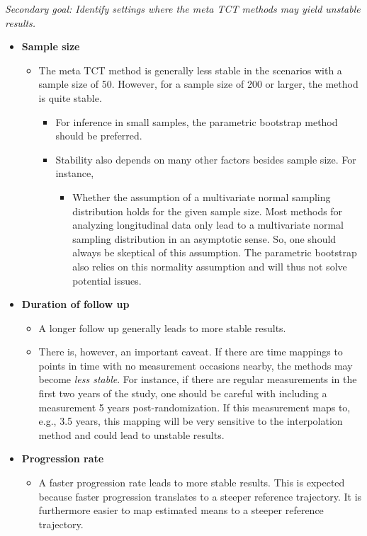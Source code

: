 \documentclass[
]{article}
\providecommand{\tightlist}{%
  \setlength{\itemsep}{0pt}\setlength{\parskip}{0pt}}
\begin{document}
\emph{Secondary goal: Identify settings where the meta TCT methods may yield
unstable results.}

\begin{itemize}
\tightlist
\item
  \textbf{Sample size}

  \begin{itemize}
  \tightlist
  \item
    The meta TCT method is generally less stable in the scenarios with a sample size of 50.
    However, for a sample size of 200 or larger, the method is quite stable.

    \begin{itemize}
    \tightlist
    \item
      For inference in small samples, the parametric bootstrap method should be preferred.
    \item
      Stability also depends on many other factors besides sample size. For instance,

      \begin{itemize}
      \tightlist
      \item
        Whether the assumption of a multivariate normal sampling distribution holds for
        the given sample size. Most methods for analyzing longitudinal data only
        lead to a multivariate normal sampling distribution in an asymptotic sense.
        So, one should always be skeptical of this assumption. The parametric
        bootstrap also relies on this normality assumption and will thus not solve
        potential issues.
      \end{itemize}
    \end{itemize}
  \end{itemize}
\item
  \textbf{Duration of follow up}

  \begin{itemize}
  \tightlist
  \item
    A longer follow up generally leads to more stable results.
  \item
    There is, however, an important caveat. If there are time mappings to points
    in time with no measurement occasions nearby, the methods may become \emph{less stable}.
    For instance, if there are regular measurements in the first two years of the study,
    one should be careful with including a measurement 5 years post-randomization.
    If this measurement maps to, e.g., 3.5 years, this mapping will be very sensitive
    to the interpolation method and could lead to unstable results.
  \end{itemize}
\item
  \textbf{Progression rate}

  \begin{itemize}
  \tightlist
  \item
    A faster progression rate leads to more stable results. This is expected because
    faster progression translates to a steeper reference trajectory. It is furthermore
    easier to map estimated means to a steeper reference trajectory.
  \end{itemize}
\end{itemize}
\end{document}

